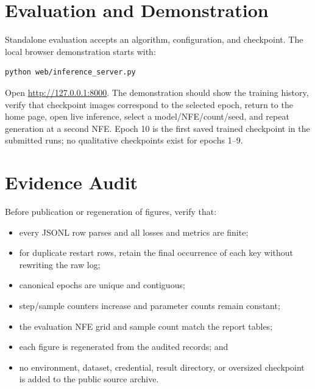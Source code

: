 \section{Evaluation and Demonstration}

Standalone evaluation accepts an algorithm, configuration, and checkpoint. The
local browser demonstration starts with:

\begin{lstlisting}[language=bash]
python web/inference_server.py
\end{lstlisting}

Open \url{http://127.0.0.1:8000}. The demonstration should show the training
history, verify that checkpoint images correspond to the selected epoch, return
to the home page, open live inference, select a model/NFE/count/seed, and repeat
generation at a second NFE. Epoch 10 is the first saved trained checkpoint in
the submitted runs; no qualitative checkpoints exist for epochs 1--9.

\section{Evidence Audit}

Before publication or regeneration of figures, verify that:

\begin{itemize}
  \item every JSONL row parses and all losses and metrics are finite;
  \item for duplicate restart rows, retain the final occurrence of each key
        without rewriting the raw log;
  \item canonical epochs are unique and contiguous;
  \item step/sample counters increase and parameter counts remain constant;
  \item the evaluation NFE grid and sample count match the report tables;
  \item each figure is regenerated from the audited records; and
  \item no environment, dataset, credential, result directory, or oversized
        checkpoint is added to the public source archive.
\end{itemize}
